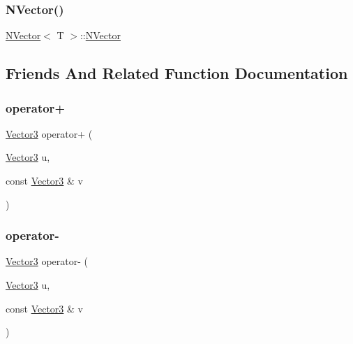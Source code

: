 \subsubsection{\texorpdfstring{NVector()}{NVector()}\hspace{0.1cm}{\footnotesize\ttfamily [5/5]}}
{\footnotesize\ttfamily \mbox{\hyperlink{class_n_vector}{N\+Vector}}$<$ T $>$\+::\mbox{\hyperlink{class_n_vector}{N\+Vector}}\hspace{0.3cm}{\ttfamily [explicit]}}



\subsection{Friends And Related Function Documentation}
\mbox{\label{class_vector3_a09b6fd43617473072319da125cc1ece8}} 
\subsubsection{\texorpdfstring{operator+}{operator+}}
{\footnotesize\ttfamily \mbox{\hyperlink{class_vector3}{Vector3}} operator+ (\begin{DoxyParamCaption}\item[{\mbox{\hyperlink{class_vector3}{Vector3}}}]{u,  }\item[{const \mbox{\hyperlink{class_vector3}{Vector3}} \&}]{v }\end{DoxyParamCaption})\hspace{0.3cm}{\ttfamily [friend]}}

\mbox{\label{class_vector3_ad504438b7c6757ab73c48013919f8333}} 
\subsubsection{\texorpdfstring{operator-\/}{operator-}\hspace{0.1cm}{\footnotesize\ttfamily [1/2]}}
{\footnotesize\ttfamily \mbox{\hyperlink{class_vector3}{Vector3}} operator-\/ (\begin{DoxyParamCaption}\item[{\mbox{\hyperlink{class_vector3}{Vector3}}}]{u,  }\item[{const \mbox{\hyperlink{class_vector3}{Vector3}} \&}]{v }\end{DoxyParamCaption})\hspace{0.3cm}{\ttfamily [friend]}}

